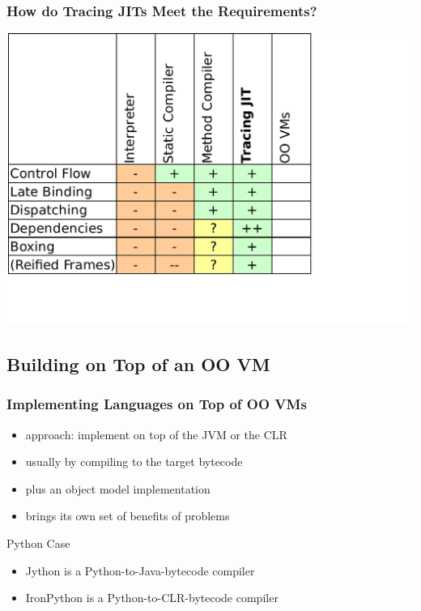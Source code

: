 \documentclass[utf8x]{beamer}
\begin{document}
\begin{frame}
  \frametitle{How do Tracing JITs Meet the Requirements?}
  \includegraphics[scale=0.6]{figures/output4.pdf}
\end{frame}


\subsection{Building on Top of an OO VM}

\begin{frame}
  \frametitle{Implementing Languages on Top of OO VMs}
  \begin{itemize}
  \item approach: implement on top of the JVM or the CLR
  \item usually by compiling to the target bytecode
  \item plus an object model implementation
  \item brings its own set of benefits of problems
  \end{itemize}
  \pause
  \begin{block}{
    Python Case}
    \begin{itemize}
    \item \alert{Jython} is a Python-to-Java-bytecode compiler
    \item \alert{IronPython} is a Python-to-CLR-bytecode compiler
    \end{itemize}
  \end{block}
\end{frame}
\end{document}
